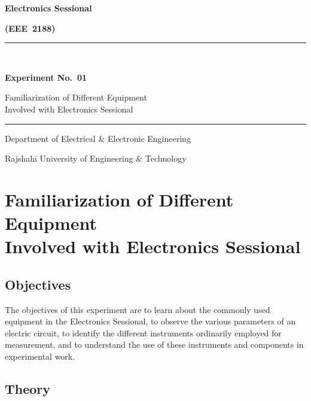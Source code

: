 \documentclass[12pt, a4paper, twoside]{report}
\newcommand{\CourseCode}{EEE~2188}
\newcommand{\CourseTitle}{Electronics Sessional}
\newcommand{\ExperimentNo}{01}
\newcommand{\ExperimentName}{Familiarization of Different Equipment\\[4pt]Involved with Electronics Sessional}
\newcommand{\Department}{Department of Electrical \& Electronic Engineering}
\newcommand{\Institution}{Rajshahi University of Engineering \& Technology}
\begin{document}

\begin{titlepage}
  \centering
  \vspace*{1.5cm}
  {\Large\bfseries \CourseTitle \par}
  \vspace{0.4cm}
  {\large\bfseries (\CourseCode) \par}
  \vspace{1.2cm}
  \rule{\linewidth}{0.6pt}\\[8pt]
  {\LARGE\bfseries Experiment No.~\ExperimentNo \par}
  \vspace{0.6cm}
  {\Large \ExperimentName \par}
  \rule{\linewidth}{0.6pt}
  \vfill
  {\large \Department \par}
  \vspace{0.3cm}
  {\large \Institution \par}
  \vspace{1.5cm}
\end{titlepage}

\chapter[\ExperimentNo]{\ExperimentName}

\section{Objectives}

The objectives of this experiment are to learn about the commonly used equipment in the
Electronics Sessional, to observe the various parameters of an electric circuit, to identify
the different instruments ordinarily employed for measurement, and to understand the use
of these instruments and components in experimental work.

\section{Theory}
\end{document}
